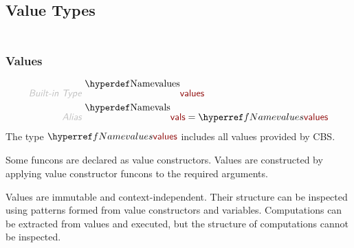 \subsection*{Value Types}\hypertarget{value-types}{}\label{value-types}

\begin{align*}
  [ ~ 
  \KEY{Type} ~ & \NAMEREF{values} \\
  \KEY{Alias} ~ & \NAMEREF{vals} \\
  \KEY{Type} ~ & \NAMEREF{value-types} \\
  \KEY{Alias} ~ & \NAMEREF{types} \\
  \KEY{Type} ~ & \NAMEREF{empty-type} \\
  \KEY{Funcon} ~ & \NAMEREF{is-in-type} \\
  \KEY{Alias} ~ & \NAMEREF{is} \\
  \KEY{Funcon} ~ & \NAMEREF{is-value} \\
  \KEY{Alias} ~ & \NAMEREF{is-val} \\
  \KEY{Funcon} ~ & \NAMEREF{when-true} \\
  \KEY{Alias} ~ & \NAMEREF{when} \\
  \KEY{Type} ~ & \NAMEREF{cast-to-type} \\
  \KEY{Alias} ~ & \NAMEREF{cast} \\
  \KEY{Type} ~ & \NAMEREF{ground-values} \\
  \KEY{Alias} ~ & \NAMEREF{ground-vals} \\
  \KEY{Funcon} ~ & \NAMEREF{is-equal} \\
  \KEY{Alias} ~ & \NAMEREF{is-eq}
  ~ ]
\end{align*}
\subsubsection*{Values}\hypertarget{values}{}\label{values}

\begin{align*}
  \KEY{Built-in Type} ~  
  & \NAMEDECL{values} 
\\
  \KEY{Alias} ~ 
  & \NAMEDECL{vals} = \NAMEREF{values}
\end{align*}
The type $\SHADE{\NAMEREF{values}}$ includes all values provided by CBS.

Some funcons are declared as value constructors. Values are constructed by
  applying value constructor funcons to the required arguments.

Values are immutable and context-independent. Their structure can be
  inspected using patterns formed from value constructors and variables.
  Computations can be extracted from values and executed, but the structure
  of computations cannot be inspected.


